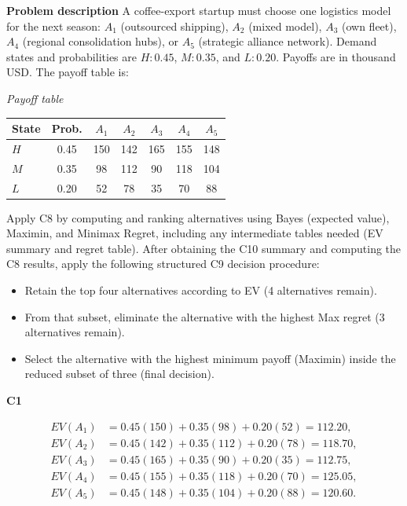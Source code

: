 	\begin{ExamProblems}
		\item
		\textbf{Problem description}
		A coffee-export startup must choose one logistics model for the next season: $A_1$ (outsourced shipping), $A_2$ (mixed model), $A_3$ (own fleet), $A_4$ (regional consolidation hubs), or $A_5$ (strategic alliance network).
		Demand states and probabilities are $H:0.45$, $M:0.35$, and $L:0.20$. Payoffs are in thousand USD. The payoff table is:
		
		\begin{center}
			\textit{Payoff table} \\
			\begin{tabular}{l c c c c c c}
				\hline
				State& Prob. & $A_1$ & $A_2$ & $A_3$ & $A_4$ & $A_5$ \\
				\hline
				$H$ & 0.45 & 150 & 142 & 165 & 155 & 148 \\
				$M$ & 0.35 & 98 & 112 & 90 & 118 & 104 \\
				$L$ & 0.20 & 52 & 78 & 35 & 70 & 88 \\
				\hline
			\end{tabular}
		\end{center}
		
		Apply C8 by computing and ranking alternatives using Bayes (expected value), Maximin, and Minimax Regret, including any intermediate tables needed (EV summary and regret table).
		After obtaining the C10 summary and computing the C8 results, apply the following structured C9 decision procedure:
		\begin{itemize}
			\item Retain the top four alternatives according to EV (4 alternatives remain).
			\item From that subset, eliminate the alternative with the highest Max regret (3 alternatives remain).
			\item Select the alternative with the highest minimum payoff (Maximin) inside the reduced subset of three (final decision).
		\end{itemize}
		
		\vspace{0.25cm}
		
		\textbf{C1}\par
				\[
		\begin{aligned}
			EV(A_1)&=0.45(150)+0.35(98)+0.20(52)=112.20,\\
			EV(A_2)&=0.45(142)+0.35(112)+0.20(78)=118.70,\\
			EV(A_3)&=0.45(165)+0.35(90)+0.20(35)=112.75,\\
			EV(A_4)&=0.45(155)+0.35(118)+0.20(70)=125.05,\\
			EV(A_5)&=0.45(148)+0.35(104)+0.20(88)=120.60.
		\end{aligned}
		\]
		


\end{ExamProblems}

